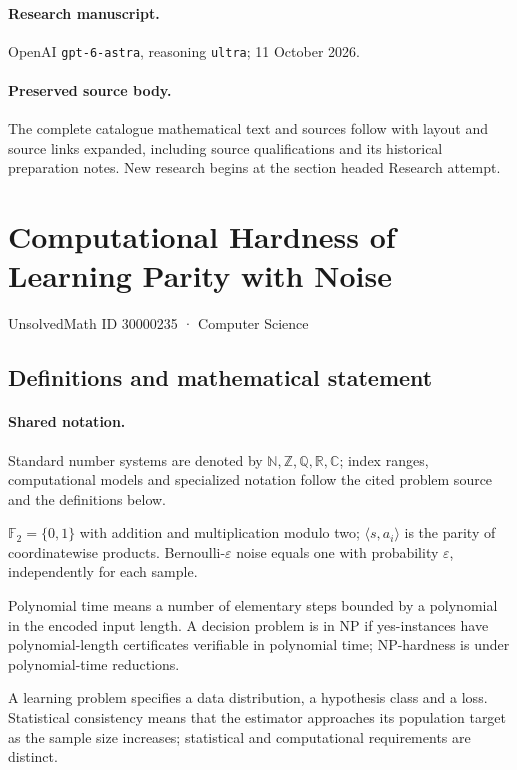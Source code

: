 \documentclass[11pt]{article}
\begin{document}
\paragraph{Research manuscript.} OpenAI \texttt{gpt-6-astra}, reasoning \texttt{ultra}; 11 October 2026.
\paragraph{Preserved source body.} The complete catalogue mathematical text and sources follow with layout and source links expanded, including source qualifications and its historical preparation notes. New research begins at the section headed Research attempt.

\section{Computational Hardness of Learning Parity with Noise}\label{30000235}
{\small UnsolvedMath ID 30000235 · Computer Science}
\subsection{Definitions and mathematical statement}

\paragraph{Shared notation.}Standard number systems are denoted by $\mathbb N,\mathbb Z,\mathbb Q,\mathbb R,\mathbb C$; index ranges, computational models and specialized notation follow the cited problem source and the definitions below.


$\mathbb F_2=\{0,1\}$ with addition and multiplication modulo two; $\langle s,a_i\rangle$ is the parity of coordinatewise products. Bernoulli-$\varepsilon$ noise equals one with probability $\varepsilon$, independently for each sample.

Polynomial time means a number of elementary steps bounded by a polynomial in the encoded input length. A decision problem is in $\mathrm{NP}$ if yes-instances have polynomial-length certificates verifiable in polynomial time; NP-hardness is under polynomial-time reductions.

A learning problem specifies a data distribution, a hypothesis class and a loss. Statistical consistency means that the estimator approaches its population target as the sample size increases; statistical and computational requirements are distinct.
\end{document}
